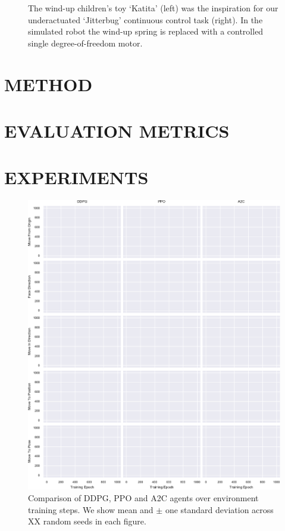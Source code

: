 \documentclass[letterpaper, 10 pt, conference]{ieeeconf}
\begin{document}
\begin{figure}[ht]
    \caption{
        The wind-up children's toy `Katita' (left) was the inspiration for our underactuated `Jitterbug' continuous control task (right).
        In the simulated robot the wind-up spring is replaced with a controlled single degree-of-freedom motor.
    }
    \label{fig:leader}
    
\end{figure}

\section{METHOD}

\lipsum[1]

\section{EVALUATION METRICS}

\lipsum[1]

\section{EXPERIMENTS}

\lipsum[1]

\begin{figure}[p]
    
    \centering
    \includegraphics[width=\textwidth]{fig-rl-perf}
    
    \caption{
        Comparison of DDPG, PPO and A2C agents over environment training steps.
        We show mean and $\pm$ one standard deviation across XX random seeds in each figure.
    }
    
    \label{fig:rl-perf}
\end{figure}
\end{document}
